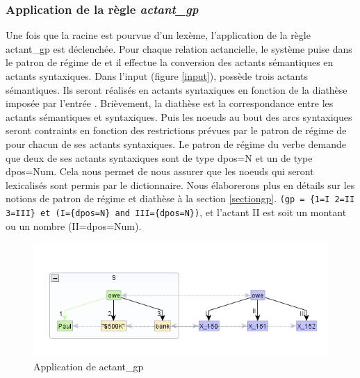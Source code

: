 \subsubsection{Application de la règle \emph{actant\_gp}}
Une fois que la racine est pourvue d'un lexème, l'application de la règle actant\_gp est déclenchée. Pour chaque relation actancielle, le système puise dans le patron de régime de  et il effectue la conversion des actants sémantiques en actants syntaxiques. Dans l'input (figure \ref{input}),  possède trois actants sémantiques. Ils seront réalisés en actants syntaxiques en fonction de la diathèse imposée par l'entrée . Brièvement, la diathèse est la correspondance entre les actants sémantiques et syntaxiques. Puis les noeuds au bout des arcs syntaxiques seront contraints en fonction des restrictions prévues par le patron de régime de  pour chacun de ses actants syntaxiques. Le patron de régime du verbe demande que deux de ses actants syntaxiques sont de type dpos=N et un de type dpos=Num. Cela nous permet de nous assurer que les noeuds qui seront lexicalisés sont permis par le dictionnaire. Nous élaborerons plus en détails sur les notions de patron de régime et diathèse à la section \ref{sectiongp}. \lstinline!(gp = {1=I 2=II 3=III} et (I={dpos=N} and III={dpos=N})!, et l'actant II est soit un montant ou un nombre (II={dpos=Num}).
\begin{figure}[htb]
	\centering
	\includegraphics[width=1\textwidth, trim = {0cm 0cm 0cm 0cm},clip]{ch3/figs/actant_gp1.png}
	\caption{Application de actant\_gp}
	\label{fig:actantgp}
\end{figure}

